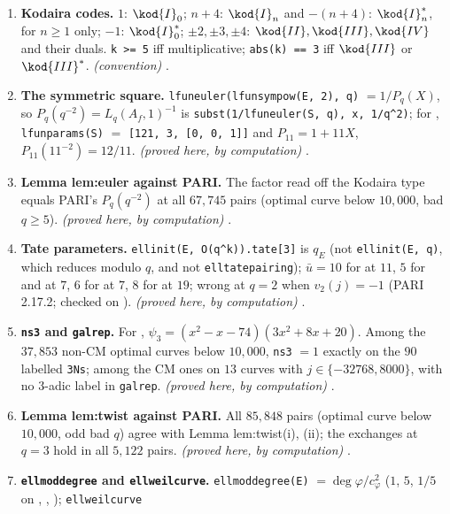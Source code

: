 \begin{enumerate}[label=\textbf{\thechapter.\arabic*}]
$L[i]=[f_p,k_p,0,c_p]$, $k_p$ PARI's Kodaira code; for , $L=[[1,10,0,2],[1,7,0,1],[2,3,0,2]]$ (types $\kod{I}_6$, $\kod{I}_3$, $\kod{III}$).
\emph{(definition)} .
\item \textbf{Kodaira codes.} $1$: $\kod{I}_0$; $n+4$: $\kod{I}_n$ and $-(n+4)$: $\kod{I}_n^*$, for $n\ge1$ only; $-1$: $\kod{I}_0^*$; $\pm2,\pm3,\pm4$: $\kod{II},\kod{III},\kod{IV}$ and their duals.
\texttt{k >= 5} iff multiplicative; \texttt{abs(k) == 3} iff $\kod{III}$ or $\kod{III}^*$. \emph{(convention)} .
\item \textbf{The symmetric square.} \texttt{lfuneuler(lfunsympow(E, 2), q)} $=1/P_q(X)$, so $P_q(q^{-2})=L_q(A_f,1)^{-1}$ is \texttt{subst(1/lfuneuler(S, q), x, 1/q\^{}2)};
for , \texttt{lfunparams(S)} $=$ \texttt{[121, 3, [0, 0, 1]]} and $P_{11}=1+11X$, $P_{11}(11^{-2})=12/11$. \emph{(proved here, by computation)}
.
\item \textbf{Lemma lem:euler against PARI.} The factor read off the Kodaira type equals PARI's $P_q(q^{-2})$ at all $67{,}745$ pairs (optimal curve below $10{,}000$, bad
$q\ge5$). \emph{(proved here, by computation)} .
\item \textbf{Tate parameters.} \texttt{ellinit(E, O(q\^{}k)).tate[3]} is $q_E$ (not \texttt{ellinit(E, q)}, which reduces modulo $q$, and not \texttt{elltatepairing});
$\bar u=10$ for  at $11$, $5$ for  and  at $7$, $6$ for  at $7$, $8$ for  at $19$; wrong at $q=2$ when $v_2(j)=-1$
(PARI 2.17.2; checked on ). \emph{(proved here, by computation)} .
\item \textbf{\texttt{ns3} and \texttt{galrep}.} For , $\psi_3=(x^2-x-74)(3x^2+8x+20)$. Among the $37{,}853$ non-CM optimal curves below $10{,}000$, \texttt{ns3} $=1$ exactly on the
$90$ labelled \texttt{3Ns}; among the CM ones on $13$ curves with $j\in\{-32768,8000\}$, with no $3$-adic label in \texttt{galrep}. \emph{(proved here, by computation)}
.
\item \textbf{Lemma lem:twist against PARI.} All $85{,}848$ pairs (optimal curve below $10{,}000$, odd bad $q$) agree with Lemma lem:twist(i), (ii); the exchanges at $q=3$
hold in all $5{,}122$ pairs. \emph{(proved here, by computation)} .
\item \textbf{\texttt{ellmoddegree} and \texttt{ellweilcurve}.} \texttt{ellmoddegree(E)} $=\deg\varphi/c_\varphi^2$ ($1$, $5$, $1/5$ on , , ); \texttt{ellweilcurve}

\end{enumerate}

